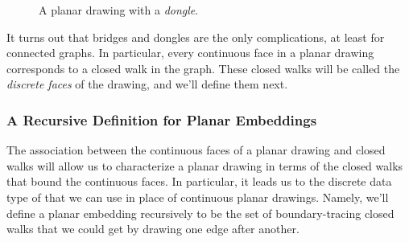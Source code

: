 \begin{figure}


\caption{A planar drawing with a \emph{dongle}.}
\label{fig:dongle}
\end{figure}

It turns out that bridges and dongles are the only complications, at least
for connected graphs.  In particular, every continuous face in a planar
drawing corresponds to a closed walk in the graph.  These closed walks
will be called the \emph{discrete faces} of the drawing, and we'll define
them next.

\subsubsection{A Recursive Definition for Planar Embeddings}

The association between the continuous faces of a planar drawing and
closed walks will allow us to characterize a planar drawing in terms
of the closed walks that bound the continuous faces.  In particular,
it leads us to the discrete data type of 
that we can use in place of continuous planar drawings.  Namely,
we'll define a planar embedding recursively to be the set of
boundary-tracing closed walks that we could get by drawing one edge
after another.

